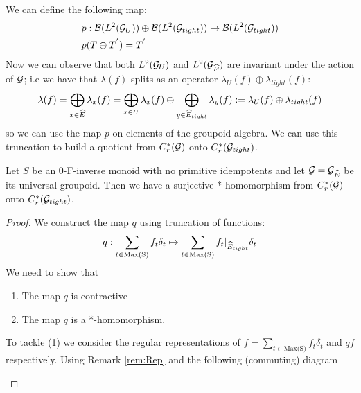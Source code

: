 \begin{corollary}
We can define the following map:
\begin{eqnarray*}\label{eqn:Quotent}
&p:\mathcal{B}(L^{2}(\mathcal{G}_{U})) \oplus\mathcal{B}( L^{2}(\mathcal{G}_{tight})) \rightarrow \mathcal{B}(L^{2}(\mathcal{G}_{tight}))\\
&p(T\oplus T^{'})=T^{'}
\end{eqnarray*}
Now we can observe that both $L^{2}(\mathcal{G}_{U})$ and $L^{2}(\mathcal{G}_{\widehat{E}})$ are invariant under the action of $\mathcal{G}$; i.e we have that $\lambda(f)$ splits as an operator $\lambda_{U}(f)\oplus \lambda_{tight}(f)$:
\begin{equation*}
\lambda(f)=\bigoplus_{x \in \widehat{E}}\lambda_{x}(f)=\bigoplus_{x \in U}\lambda_{x}(f) \oplus \bigoplus_{y \in \widehat{E}_{tight}} \lambda_{y}(f) := \lambda_{U}(f)\oplus \lambda_{tight}(f)
\end{equation*}
so we can use the map $p$ on elements of the groupoid algebra.
We can use this truncation to build a quotient from $C^{*}_{r}(\mathcal{G})$ onto $C^{*}_{r}(\mathcal{G}_{tight})$.

\begin{proposition}\label{prop:P4}
Let $S$ be an 0-F-inverse monoid with no primitive idempotents and let $\mathcal{G}=\mathcal{G}_{\widehat{E}}$ be its universal groupoid. Then we have a surjective *-homomorphism from $C^{*}_{r}(\mathcal{G})$ onto $C^{*}_{r}(\mathcal{G}_{tight})$.
\end{proposition}

\begin{proof}
We construct the map $q$ using truncation of functions:
\begin{equation*}
q: \sum_{t \in \text{Max(S)}} f_{t} \delta_{t} \mapsto \sum_{t \in \text{Max(S)}} f_{t}|_{\widehat{E}_{tight}} \delta_{t} 
\end{equation*}
We need to show that
\begin{enumerate}
\item The map $q$ is contractive
\item The map $q$ is a *-homomorphism.
\end{enumerate}
To tackle (1) we consider the regular representations of $f = \sum_{t \in \text{Max(S)}} f_{t} \delta_{t}$ and $qf$ respectively. Using Remark \ref{rem:Rep} and the following (commuting) diagram

\begin{center}
\end{center}
\end{proof}
\end{corollary}
